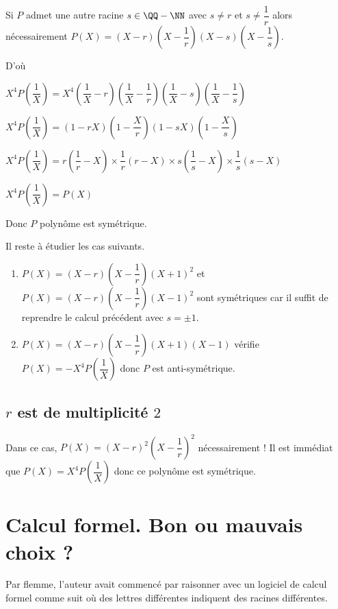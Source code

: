\documentclass[12pt]{amsart}
\begin{document}
Si $P$ admet une autre racine $s \in \QQ - \NN$ avec $s \neq r$ et $s \neq \dfrac1r$ alors nécessairement $P(X) = (X - r) \left( X - \dfrac1r \right) (X - s) \left( X - \dfrac1s \right)$.


D'où

$X^4 P\left( \dfrac1X \right)
= X^4 
  \left( \dfrac1X - r \right) \left( \dfrac1X - \dfrac1r \right) 
  \left( \dfrac1X - s \right) \left( \dfrac1X - \dfrac1s \right)$

$X^4 P\left( \dfrac1X \right)
= ( 1 - r X) \left( 1 - \dfrac{X}{r} \right) 
  ( 1 - s X) \left( 1 - \dfrac{X}{s} \right)$

$X^4 P\left( \dfrac1X \right)
= r \left( \dfrac1r - X \right) \times \dfrac1r ( r - X) 
  \times s \left( \dfrac1s - X \right) \times \dfrac1s ( s - X)$

$X^4 P\left( \dfrac1X \right)
= P(X)$

\medskip

Donc $P$ polynôme est symétrique.


\bigskip

Il reste à étudier les cas suivants.

\begin{enumerate}
	\item $P(X) = (X - r) \left( X - \dfrac1r \right) (X + 1)^2$ et $P(X) = (X - r) \left( X - \dfrac1r \right) (X - 1)^2$ sont symétriques car il suffit de reprendre le calcul précédent avec $s = \pm 1$.
	

	\item $P(X) = (X - r) \left( X - \dfrac1r \right) (X + 1) (X - 1)$ vérifie $P(X) = - X^4 P\left( \dfrac1X \right)$ donc $P$ est anti-symétrique.
\end{enumerate}


\subsection*{$r$ est de multiplicité $2$}

Dans ce cas, $P(X) = (X - r)^2 \left( X - \dfrac1r \right)^2$ nécessairement !
Il est immédiat que $P(X) = X^4 P\left( \dfrac1X \right)$ donc ce polynôme est symétrique.



\section{Calcul formel. Bon ou mauvais choix ?}

Par flemme, l'auteur avait commencé par raisonner avec un logiciel de calcul formel comme suit où des lettres différentes indiquent des racines différentes.
\end{document}
